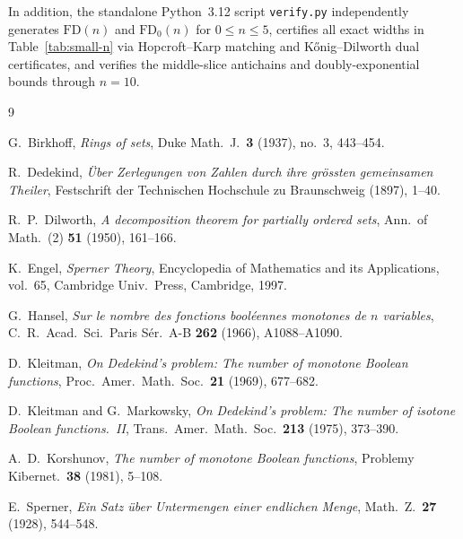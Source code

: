 \documentclass[11pt]{article}
\theoremstyle{definition}
\newcommand{\FD}{\mathrm{FD}}
\newcommand{\FDz}{\mathrm{FD}_0}
\begin{document}
In addition, the standalone Python~3.12 script \texttt{verify.py} independently generates $\FD(n)$ and $\FDz(n)$ for $0 \le n \le 5$, certifies all exact widths in Table~\ref{tab:small-n} via Hopcroft--Karp matching and K\H{o}nig--Dilworth dual certificates, and verifies the middle-slice antichains and doubly-exponential bounds through $n = 10$.

\clearpage
\begin{thebibliography}{9}

G.~Birkhoff, \emph{Rings of sets}, Duke Math.\ J.\ \textbf{3} (1937), no.~3, 443--454.

R.~Dedekind, \emph{\"{U}ber Zerlegungen von Zahlen durch ihre gr\"{o}ssten gemeinsamen Theiler}, Festschrift der Technischen Hochschule zu Braunschweig (1897), 1--40.

R.~P.~Dilworth, \emph{A decomposition theorem for partially ordered sets}, Ann.\ of Math.\ (2) \textbf{51} (1950), 161--166.

K.~Engel, \emph{Sperner Theory}, Encyclopedia of Mathematics and its Applications, vol.~65, Cambridge Univ.\ Press, Cambridge, 1997.

G.~Hansel, \emph{Sur le nombre des fonctions bool\'{e}ennes monotones de $n$ variables}, C.\ R.\ Acad.\ Sci.\ Paris S\'{e}r.\ A-B \textbf{262} (1966), A1088--A1090.

D.~Kleitman, \emph{On Dedekind's problem: The number of monotone Boolean functions}, Proc.\ Amer.\ Math.\ Soc.\ \textbf{21} (1969), 677--682.

D.~Kleitman and G.~Markowsky, \emph{On Dedekind's problem: The number of isotone Boolean functions.\ II}, Trans.\ Amer.\ Math.\ Soc.\ \textbf{213} (1975), 373--390.

A.~D.~Korshunov, \emph{The number of monotone Boolean functions}, Problemy Kibernet.\ \textbf{38} (1981), 5--108.

E.~Sperner, \emph{Ein Satz \"{u}ber Untermengen einer endlichen Menge}, Math.\ Z.\ \textbf{27} (1928), 544--548.

\end{thebibliography}
\end{document}
